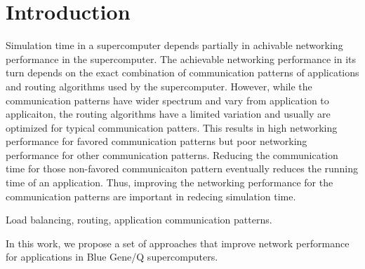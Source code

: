 \section{Introduction}
Simulation time in a supercomputer depends partially in achivable networking performance in the supercomputer. The achievable networking performance in its turn depends on the exact combination of communication patterns of applications and routing algorithms used by the supercomputer. However, while the communication patterns have wider spectrum and vary from application to applicaiton, the routing algorithms have a limited variation and usually are optimized for typical communication patters. This results in high networking performance for favored communication patterns but poor networking performance for other communication patterns. Reducing the communication time for those non-favored communicaiton pattern eventually reduces the running time of an application. Thus, improving the networking performance for the communication patterns are important in redecing simulation time. 



Load balancing, routing, application communication patterns.

In this work, we propose a set of approaches that improve network performance for applications in Blue Gene/Q supercomputers. 
